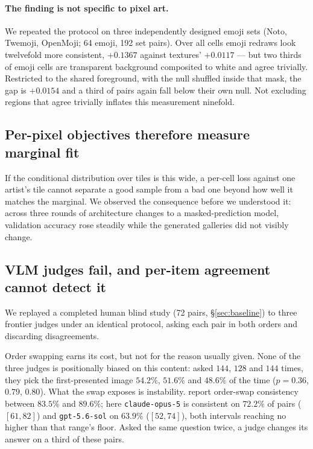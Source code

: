 \documentclass{article}
\begin{document}
\paragraph{The finding is not specific to pixel art.} We repeated the protocol
on three independently designed emoji sets (Noto, Twemoji, OpenMoji; 64 emoji,
192 set pairs). Over all cells emoji redraws look twelvefold more consistent,
$+0.1367$ against textures' $+0.0117$ --- but two thirds of emoji cells are
transparent background composited to white and agree trivially. Restricted to
the shared foreground, with the null shuffled inside that mask, the gap is
$+0.0154$ and a third of pairs again fall below their own null. Not excluding
regions that agree trivially inflates this measurement ninefold.

\subsection{Per-pixel objectives therefore measure marginal fit}

If the conditional distribution over tiles is this wide, a per-cell loss
against one artist's tile cannot separate a good sample from a bad one beyond
how well it matches the marginal. We observed the consequence before we
understood it: across three rounds of architecture changes to a
masked-prediction model, validation accuracy rose steadily while the generated
galleries did not visibly change.

\subsection{VLM judges fail, and per-item agreement cannot detect it}
\label{sec:judges}

We replayed a completed human blind study (72 pairs, \S\ref{sec:baseline}) to
three frontier judges under an identical protocol, asking each pair in both
orders and discarding disagreements.

Order swapping earns its cost, but not for the reason usually given. None of
the three judges is positionally biased on this content: asked $144$, $128$
and $144$ times, they pick the first-presented image $54.2\%$, $51.6\%$ and
$48.6\%$ of the time ($p{=}0.36$, $0.79$, $0.80$). What the swap exposes is
instability. \citet{webdevjudge2025} report order-swap consistency between
$83.5\%$ and $89.6\%$; here \texttt{claude-opus-5} is consistent on $72.2\%$
of pairs ($[61,82]$) and \texttt{gpt-5.6-sol} on $63.9\%$ ($[52,74]$), both
intervals reaching no higher than that range's floor. Asked the same question
twice, a judge changes its answer on a third of these pairs.
\end{document}
